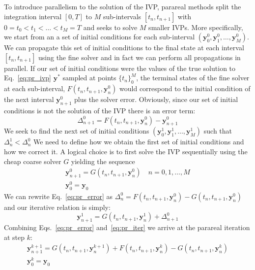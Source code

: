 \documentclass[11pt]{report}
\begin{document}
    To introduce parallelism to the solution of the IVP, parareal methods split the integration interval $[0, T]$ to $M$
    sub-intervals $[t_n, t_{n+1}]$ with $0 = t_0 < t_1 < \dots < t_M = T$ and seeks to solve $M$ smaller IVPs.
    More specifically, we start from an a set of initial conditions for each sub-interval
    $(\pmb{y}_0^{0}, \pmb{y}_1^{0}, \dots ,\pmb{y}_M^{0})$.
    We can propagate this set of initial conditions to the final state at each interval $[t_n, t_{n+1}]$ using the fine
    solver and in fact we can perform all propagations in parallel.
    If our set of initial conditions were the values of the true solution to Eq.~\ref{eq:pr_ivp} $\pmb{y}^*$ sampled at
    points $\{t_n\}_0^M$, the terminal states of the fine solver at each sub-interval, $F(t_n, t_{n+1}, \pmb{y}^0_n)$ would
    correspond to the initial condition of the next interval $\pmb{y}_{n+1}^0$ plus the solver error.
    Obviously, since our set of initial conditions is not the solution of the IVP there is an error term:
    \begin{equation}
        \label{eq:pr_error}
        \Delta^0_{n+1} = F(t_n, t_{n+1}, \pmb{y}^0_n) - \pmb{y}^0_{n+1}
    \end{equation}
    We seek to find the next set of initial conditions $(\pmb{y}_0^{1}, \pmb{y}_1^{1}, \dots ,\pmb{y}_M^{1})$ such that
    $\Delta_n^1 <  \Delta_n^0$
    We need to define how we obtain the first set of initial conditions and how we correct it.
    A logical choice is to first solve the IVP sequentially using the cheap coarse solver $G$ yielding the sequence
    \begin{gather}
        \label{eq:pr_init}
        \pmb{y}_{n+1}^0 = G(t_n, t_{n+1}, \pmb{y}_n^0) \quad n = 0,1, \dots, M \\
        \pmb{y}_0^0 = \pmb{y}_0
    \end{gather}
    We can rewrite Eq.~\eqref{eq:pr_error} as $\Delta_n^0 = F(t_n,t_{n+1}, \pmb{y}_n^0) - G(t_n, t_{n+1}, \pmb{y}_n^0)$
    and our iterative relation is simply:
    \begin{equation} \label{eq:pr_iter}
        \pmb{y}^1_{n+1} = G(t_n, t_{n+1}, \pmb{y}_n^{1}) + \Delta_{n+1}^0
    \end{equation}
    Combining Eqs.~\eqref{eq:pr_error} and~\eqref{eq:pr_iter} we arrive at the parareal iteration at step $k$:
    \begin{gather} \label{}
        \pmb{y}^{k+1}_{n+1} = G(t_n, t_{n+1}, \pmb{y}_n^{k+1}) + F(t_n, t_{n+1}, \pmb{y}_n^{k}) - G(t_n, t_{n+1}, \pmb{y}_n^{k}) \\
        \pmb{y}_0^k = \pmb{y}_0
    \end{gather}
\end{document}
